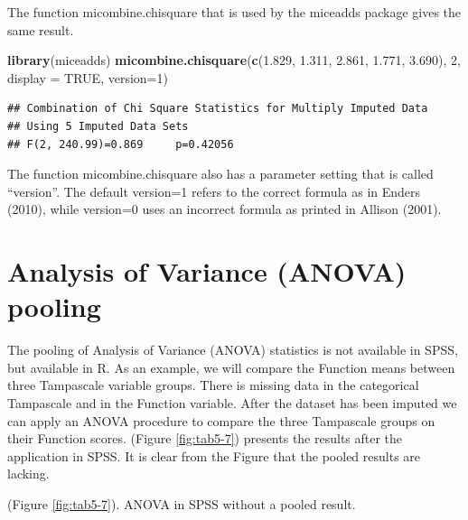 \documentclass[]{book}
\newenvironment{Shaded}{\begin{snugshade}}{\end{snugshade}}
\newcommand{\KeywordTok}[1]{\textcolor[rgb]{0.13,0.29,0.53}{\textbf{#1}}}
\newcommand{\DataTypeTok}[1]{\textcolor[rgb]{0.13,0.29,0.53}{#1}}
\newcommand{\DecValTok}[1]{\textcolor[rgb]{0.00,0.00,0.81}{#1}}
\newcommand{\FloatTok}[1]{\textcolor[rgb]{0.00,0.00,0.81}{#1}}
\newcommand{\OtherTok}[1]{\textcolor[rgb]{0.56,0.35,0.01}{#1}}
\newcommand{\NormalTok}[1]{#1}
\theoremstyle{definition}
\theoremstyle{definition}
\theoremstyle{definition}
\theoremstyle{remark}
\begin{document}
The function micombine.chisquare that is used by the miceadds package
gives the same result.

\begin{Shaded}
\begin{Highlighting}[]
\KeywordTok{library}\NormalTok{(miceadds)}
\KeywordTok{micombine.chisquare}\NormalTok{(}\KeywordTok{c}\NormalTok{(}\FloatTok{1.829}\NormalTok{, }\FloatTok{1.311}\NormalTok{, }\FloatTok{2.861}\NormalTok{, }\FloatTok{1.771}\NormalTok{, }\FloatTok{3.690}\NormalTok{), }\DecValTok{2}\NormalTok{, }\DataTypeTok{display =} \OtherTok{TRUE}\NormalTok{, }\DataTypeTok{version=}\DecValTok{1}\NormalTok{)}
\end{Highlighting}
\end{Shaded}

\begin{verbatim}
## Combination of Chi Square Statistics for Multiply Imputed Data
## Using 5 Imputed Data Sets
## F(2, 240.99)=0.869     p=0.42056
\end{verbatim}

The function micombine.chisquare also has a parameter setting that is
called ``version''. The default version=1 refers to the correct formula
as in Enders (2010), while version=0 uses an incorrect formula as
printed in Allison (2001).

\section{Analysis of Variance (ANOVA)
pooling}\label{analysis-of-variance-anova-pooling}

The pooling of Analysis of Variance (ANOVA) statistics is not available
in SPSS, but available in R. As an example, we will compare the Function
means between three Tampascale variable groups. There is missing data in
the categorical Tampascale and in the Function variable. After the
dataset has been imputed we can apply an ANOVA procedure to compare the
three Tampascale groups on their Function scores. (Figure
\ref{fig:tab5-7}) presents the results after the application in SPSS. It
is clear from the Figure that the pooled results are lacking.

(Figure \ref{fig:tab5-7}). ANOVA in SPSS without a pooled result.
\end{document}

